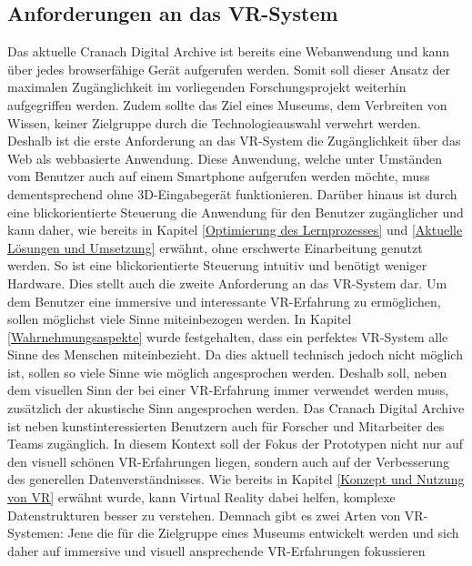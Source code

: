 \documentclass[a4paper,12pt,oneside]{article}
\begin{document}
    \subsection{Anforderungen an das VR-System}
      Das aktuelle Cranach Digital Archive ist bereits eine Webanwendung und kann 
      über jedes browserfähige Gerät aufgerufen werden. Somit soll dieser Ansatz 
      der maximalen Zugänglichkeit im vorliegenden Forschungsprojekt 
      weiterhin aufgegriffen werden.
      Zudem sollte das Ziel eines Museums, dem Verbreiten von Wissen, keiner Zielgruppe
      durch die Technologieauswahl verwehrt werden.
      Deshalb ist die erste Anforderung an das VR-System die Zugänglichkeit
      über das Web als webbasierte Anwendung.
      Diese Anwendung, welche unter Umständen vom Benutzer auch auf einem 
      Smartphone aufgerufen werden möchte, muss dementsprechend ohne 
      3D-Eingabegerät funktionieren.
      Darüber hinaus ist durch eine blickorientierte Steuerung die Anwendung für
      den Benutzer zugänglicher und kann daher, wie bereits in
      Kapitel \ref{Optimierung des Lernprozesses}
      und \ref{Aktuelle Lösungen und Umsetzung} erwähnt, ohne erschwerte Einarbeitung
      genutzt werden. 
      So ist eine blickorientierte Steuerung intuitiv und benötigt weniger
      Hardware. Dies stellt auch die zweite Anforderung an das VR-System dar.
      Um dem Benutzer eine immersive und interessante VR-Erfahrung zu ermöglichen, sollen
      möglichst viele Sinne miteinbezogen werden. In Kapitel \ref{Wahrnehmungsaspekte}
      wurde festgehalten, dass ein perfektes VR-System alle Sinne des Menschen miteinbezieht.
      Da dies aktuell technisch jedoch nicht möglich ist, sollen so viele Sinne
      wie möglich angesprochen werden. Deshalb soll, neben dem
      visuellen Sinn der bei einer VR-Erfahrung immer
      verwendet werden muss, zusätzlich der akustische Sinn angesprochen werden.
      Das Cranach Digital Archive ist neben kunstinteressierten Benutzern auch für
      Forscher und Mitarbeiter des Teams zugänglich. In diesem Kontext soll der
      Fokus der Prototypen nicht nur auf den visuell schönen VR-Erfahrungen liegen,
      sondern auch auf der Verbesserung des generellen Datenverständnisses.
      Wie bereits in Kapitel \ref{Konzept und Nutzung von VR}
      erwähnt wurde, kann Virtual Reality dabei helfen, komplexe Datenstrukturen besser
      zu verstehen. Demnach gibt es zwei Arten von VR-Systemen: Jene die für die 
      Zielgruppe eines Museums entwickelt werden und sich daher auf immersive 
      und visuell ansprechende VR-Erfahrungen fokussieren 
\end{document}
